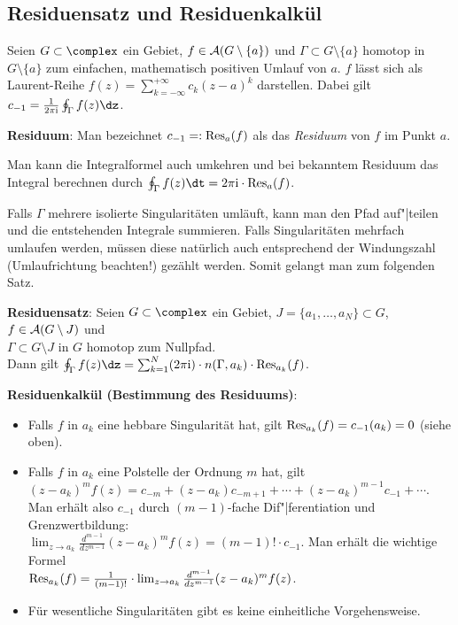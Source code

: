 \pagebreak

\subsection{%
    Residuensatz und Residuenkalkül%
}

Seien $G \subset \complex$ ein Gebiet, $f \in \mathcal{A}(G \setminus \{a\})$
und $\Gamma \subset G \setminus \{a\}$ homotop in $G \setminus \{a\}$ zum
einfachen, mathematisch positiven Umlauf von $a$.
$f$ lässt sich als Laurent-Reihe
$f(z) = \sum_{k=-\infty}^{+\infty} c_k (z - a)^k$
darstellen.
Dabei gilt $c_{-1} = \frac{1}{2\pi\i} \oint_\Gamma f(z)\dz$.

\textbf{Residuum}:
Man bezeichnet $c_{-1} =: \operatorname{Res}_a(f)$ als
das \emph{Residuum} von $f$ im Punkt $a$.

Man kann die Integralformel auch umkehren und bei bekanntem Residuum das
Integral berechnen durch
$\oint_\Gamma f(z)\dt = 2\pi\i \cdot \Res_a(f)$.

Falls $\Gamma$ mehrere isolierte Singularitäten umläuft, kann man den
Pfad auf"|teilen und die entstehenden Integrale summieren.
Falls Singularitäten mehrfach umlaufen werden, müssen diese natürlich auch
entsprechend der Windungszahl (Umlaufrichtung beachten!) gezählt werden.
Somit gelangt man zum folgenden Satz.

\textbf{Residuensatz}:
Seien $G \subset \complex$ ein Gebiet, $J = \{a_1, \dotsc, a_N\} \subset G$,
$f \in \mathcal{A}(G \setminus J)$ und\\
$\Gamma \subset G \setminus J$ in $G$ homotop zum Nullpfad.\\
Dann gilt $\oint_\Gamma f(z)\dz =
\sum_{k=1}^N (2\pi\i) \cdot n(\Gamma, a_k) \cdot \Res_{a_k}(f)$.

\linie

\textbf{Residuenkalkül (Bestimmung des Residuums)}:
\begin{itemize}
    \item
    Falls $f$ in $a_k$ eine hebbare Singularität hat, gilt
    $\operatorname{Res}_{a_k}(f) = c_{-1}(a_k) = 0$ (siehe oben).

    \item
    Falls $f$ in $a_k$ eine Polstelle der Ordnung $m$ hat, gilt\\
    $(z - a_k)^m f(z) =
    c_{-m} + (z - a_k) c_{-m+1} + \dotsb + (z - a_k)^{m-1} c_{-1} + \dotsb$.\\
    Man erhält also $c_{-1}$ durch $(m - 1)$-fache Dif"|ferentiation
    und Grenzwertbildung:\\
    $\lim_{z \to a_k} \frac{d^{m-1}}{dz^{m-1}} (z - a_k)^m f(z) =
    (m - 1)! \cdot c_{-1}$.
    Man erhält die wichtige Formel\\
    $\operatorname{Res}_{a_k}(f) = \frac{1}{(m - 1)!} \cdot
    \lim_{z \to a_k} \frac{d^{m-1}}{dz^{m-1}} (z - a_k)^m f(z)$.

    \item
    Für wesentliche Singularitäten gibt es keine einheitliche Vorgehensweise.
\end{itemize}

